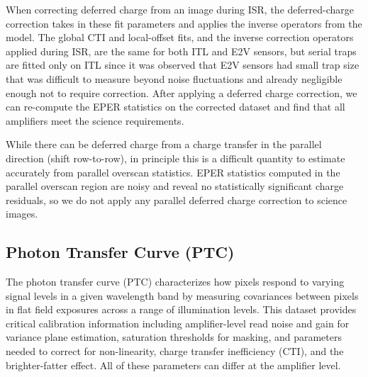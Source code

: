 When correcting deferred charge from an image during ISR, the deferred-charge correction takes in these fit parameters and applies the inverse operators from the model.
The global CTI and local-offset fits, and the inverse correction operators applied during ISR, are the same for both ITL and E2V sensors, but serial traps are fitted only on ITL since it was observed that E2V sensors had small trap size that was difficult to measure beyond noise fluctuations and already negligible enough not to require correction.
After applying a deferred charge correction, we can re-compute the EPER statistics on the corrected dataset and find that all amplifiers meet the science requirements.

While there can be deferred charge from a charge transfer in the parallel direction (shift row-to-row), in principle this is a difficult quantity to estimate accurately from parallel overscan statistics.
EPER statistics computed in the parallel overscan region are noisy and reveal no statistically significant charge residuals, so we do not apply any parallel deferred charge correction to science images.



\subsection{Photon Transfer Curve (PTC)} \label{sec:processing:calibration:ptc}

The photon transfer curve (PTC) characterizes how pixels respond to varying signal levels in a given wavelength band by measuring covariances between pixels in flat field exposures across a range of illumination levels.
This dataset provides critical calibration information including amplifier-level read noise and gain for variance plane estimation, saturation thresholds for masking, and parameters needed to correct for non-linearity, charge transfer inefficiency (CTI), and the brighter-fatter effect.
All of these parameters can differ at the amplifier level.


